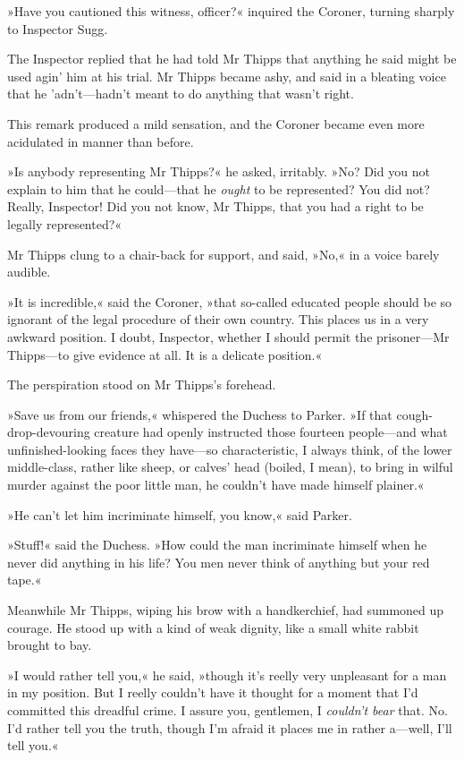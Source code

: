 »Have you cautioned this witness, officer?« inquired the Coroner, turning sharply to Inspector Sugg.

The Inspector replied that he had told Mr Thipps that anything he said might be used agin' him at his trial. Mr Thipps became ashy, and said in a bleating voice that he 'adn't\allowbreak---\allowbreak hadn't meant to do anything that wasn't right.

This remark produced a mild sensation, and the Coroner became even more acidulated in manner than before.

»Is anybody representing Mr Thipps?« he asked, irritably. »No? Did you not explain to him that he could\allowbreak---\allowbreak that he \textit{ought} to be represented? You did not? Really, Inspector! Did you not know, Mr Thipps, that you had a right to be legally represented?«

Mr Thipps clung to a chair-back for support, and said, »No,« in a voice barely audible.

»It is incredible,« said the Coroner, »that so-called educated people should be so ignorant of the legal procedure of their own country. This places us in a very awkward position. I doubt, Inspector, whether I should permit the prisoner\allowbreak---\allowbreak Mr Thipps\allowbreak---\allowbreak to give evidence at all. It is a delicate position.«

The perspiration stood on Mr Thipps's forehead.

»Save us from our friends,« whispered the Duchess to Parker. »If that cough-drop-devouring creature had openly instructed those fourteen people\allowbreak---\allowbreak and what unfinished-looking faces they have\allowbreak---\allowbreak so characteristic, I always think, of the lower middle-class, rather like sheep, or calves' head (boiled, I mean), to bring in wilful murder against the poor little man, he couldn't have made himself plainer.«

»He can't let him incriminate himself, you know,« said Parker.

»Stuff!« said the Duchess. »How could the man incriminate himself when he never did anything in his life? You men never think of anything but your red tape.«

Meanwhile Mr Thipps, wiping his brow with a handkerchief, had summoned up courage. He stood up with a kind of weak dignity, like a small white rabbit brought to bay.

»I would rather tell you,« he said, »though it's reelly very unpleasant for a man in my position. But I reelly couldn't have it thought for a moment that I'd committed this dreadful crime. I assure you, gentlemen, I \textit{couldn't bear} that. No. I'd rather tell you the truth, though I'm afraid it places me in rather a\allowbreak---\allowbreak well, I'll tell you.«


